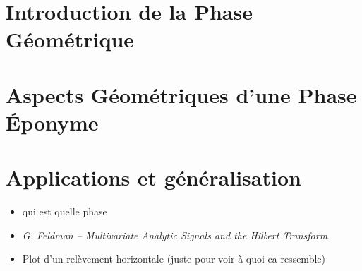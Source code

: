 \newpage








\part{Introduction de la Phase Géométrique} \label{part:param_instant} 




\part{Aspects Géométriques d'une Phase Éponyme} \label{part:phase_geo} 




\part{Applications et généralisation} \label{part:app&gene} 





	
	


	



\newpage
\begin{itemize}
	\item qui est quelle phase
	
	\item \textit{G. Feldman – Multivariate Analytic Signals and the Hilbert Transform}
	
	\item Plot d'un relèvement horizontale (juste pour voir à quoi ca ressemble)
\end{itemize}
	
	
	

\newpage

\listoffigures
\vfill
\lstlistoflistings
\vfill

\newpage

{}


